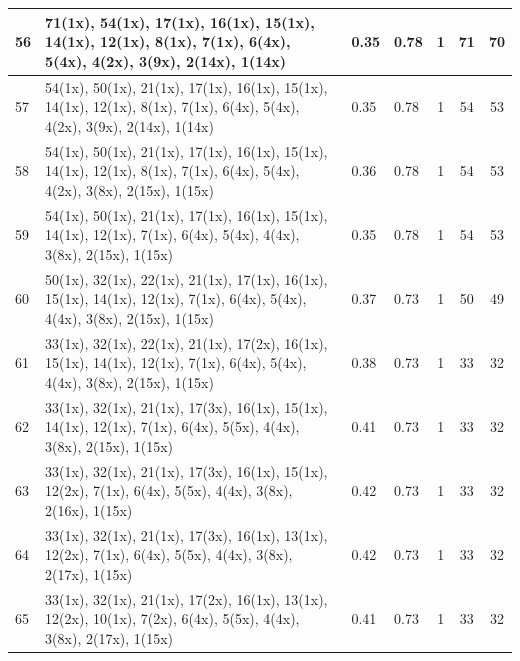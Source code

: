 \begin{small}
\begin{longtable}{|p{0.5cm}|p{9cm}|p{1.3cm}|p{1.3cm}|c|c|c|}
  56 & 71(1x), 54(1x), 17(1x), 16(1x), 15(1x), 14(1x), 12(1x), 8(1x), 7(1x), 6(4x), 5(4x), 4(2x), 3(9x), 2(14x), 1(14x) & \cellcolor{colorGood}  0.35 & \cellcolor{colorGood} 0.78 & 1 & 71 & \cellcolor{colorBad} 70 \\   \hline
  57 & 54(1x), 50(1x), 21(1x), 17(1x), 16(1x), 15(1x), 14(1x), 12(1x), 8(1x), 7(1x), 6(4x), 5(4x), 4(2x), 3(9x), 2(14x), 1(14x) & \cellcolor{colorGood}  0.35 & \cellcolor{colorGood} 0.78 & 1 & 54 & \cellcolor{colorBad} 53 \\   \hline
  58 & 54(1x), 50(1x), 21(1x), 17(1x), 16(1x), 15(1x), 14(1x), 12(1x), 8(1x), 7(1x), 6(4x), 5(4x), 4(2x), 3(8x), 2(15x), 1(15x) & \cellcolor{colorGood}  0.36 & \cellcolor{colorGood} 0.78 & 1 & 54 & \cellcolor{colorBad} 53 \\   \hline
  59 & 54(1x), 50(1x), 21(1x), 17(1x), 16(1x), 15(1x), 14(1x), 12(1x), 7(1x), 6(4x), 5(4x), 4(4x), 3(8x), 2(15x), 1(15x) & \cellcolor{colorGood}  0.35 & \cellcolor{colorGood} 0.78 & 1 & 54 & \cellcolor{colorBad} 53 \\   \hline
  60 & 50(1x), 32(1x), 22(1x), 21(1x), 17(1x), 16(1x), 15(1x), 14(1x), 12(1x), 7(1x), 6(4x), 5(4x), 4(4x), 3(8x), 2(15x), 1(15x) & \cellcolor{colorGood}  0.37 & \cellcolor{colorGood} 0.73 & 1 & 50 & \cellcolor{colorBad} 49 \\   \hline
  61 & 33(1x), 32(1x), 22(1x), 21(1x), 17(2x), 16(1x), 15(1x), 14(1x), 12(1x), 7(1x), 6(4x), 5(4x), 4(4x), 3(8x), 2(15x), 1(15x) & \cellcolor{colorGood}  0.38 & \cellcolor{colorGood} 0.73 & 1 & 33 & \cellcolor{colorBad} 32 \\   \hline
  62 & 33(1x), 32(1x), 21(1x), 17(3x), 16(1x), 15(1x), 14(1x), 12(1x), 7(1x), 6(4x), 5(5x), 4(4x), 3(8x), 2(15x), 1(15x) & \cellcolor{colorGood}  0.41 & \cellcolor{colorGood} 0.73 & 1 & 33 & \cellcolor{colorBad} 32 \\   \hline
  63 & 33(1x), 32(1x), 21(1x), 17(3x), 16(1x), 15(1x), 12(2x), 7(1x), 6(4x), 5(5x), 4(4x), 3(8x), 2(16x), 1(15x) & \cellcolor{colorGood}  0.42 & \cellcolor{colorGood} 0.73 & 1 & 33 & \cellcolor{colorBad} 32 \\   \hline
  64 & 33(1x), 32(1x), 21(1x), 17(3x), 16(1x), 13(1x), 12(2x), 7(1x), 6(4x), 5(5x), 4(4x), 3(8x), 2(17x), 1(15x) & \cellcolor{colorGood}  0.42 & \cellcolor{colorGood} 0.73 & 1 & 33 & \cellcolor{colorBad} 32 \\   \hline
  65 & 33(1x), 32(1x), 21(1x), 17(2x), 16(1x), 13(1x), 12(2x), 10(1x), 7(2x), 6(4x), 5(5x), 4(4x), 3(8x), 2(17x), 1(15x) & \cellcolor{colorGood}  0.41 & \cellcolor{colorGood} 0.73 & 1 & 33 & \cellcolor{colorBad} 32 \\   \hline

\end{longtable}
\end{small}
